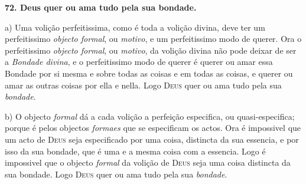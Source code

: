  \textbf{72. Deus quer ou ama tudo pela sua bondade.}

a) Uma volição perfeitissima, como é toda a volição divina, deve ter um perfeitissimo \emph{objecto formal}, ou \emph{motivo}, e um perfeitissimo modo de querer. Ora o perfeitissimo \emph{objecto formal}, ou \emph{motivo}, da volição divina não pode deixar de ser a \emph{Bondade divina}, e o perfeitissimo modo de querer é querer ou amar essa Bondade por si mesma e sobre todas as coisas e em todas as coisas, e querer ou amar as outras coisas por ella e nella. Logo \textsc{Deus} quer ou ama tudo pela sua \emph{bondade}.

b) O objecto \emph{formal} dá a cada volição a perfeição especifica, ou quasi-especifica; porque é pelos objectos \emph{formaes} que se especificam os actos. Ora é impossivel que um acto de \textsc{Deus} seja especificado por uma coisa, distincta da sua essencia, e por isso da sua bondade, que é uma e a mesma coisa com a essencia. Logo é impossivel que o objecto \emph{formal} da volição de \textsc{Deus} seja uma coisa distincta da sua bondade. Logo \textsc{Deus} quer ou ama tudo pela sua \emph{bondade}.

